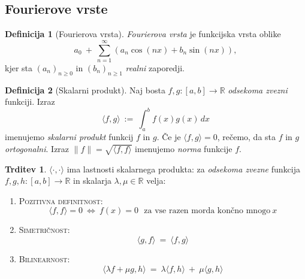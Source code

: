 \documentclass[11pt]{article}
\newcommand{\R}{\mathbb{R}}
\theoremstyle{definition}
\newtheorem{definicija}{Definicija}[section]
\theoremstyle{definition}
\newtheorem{trditev}{Trditev}[section]
\theoremstyle{definition}
\theoremstyle{theorem}
\begin{document}

\subsection{Fourierove vrste}
\vspace{0.5cm}

\begin{definicija}[Fourierova vrsta]

\textit{Fourierova vrsta} je funkcijska vrsta oblike
$$a_0 ~+~ \sum_{n=1}^{\infty} (a_n \cos(nx) + b_n \sin(nx)),$$
kjer sta $(a_n)_{n \geq 0}$ in $(b_n)_{n \geq 1}$ \textit{realni} zaporedji.

\end{definicija}
\vspace{0.5cm}

\begin{definicija}[Skalarni produkt]

Naj bosta $f, g: [a, b] \rightarrow \mathbb{R}$ \textit{odsekoma zvezni} funkciji. Izraz
$$\langle f, g \rangle ~:=~ \int_{a}^{b} f(x) g(x)\,dx$$
imenujemo \textit{skalarni produkt} funkcij $f$ in $g$. Če je $\langle f, g \rangle = 0$, rečemo, da sta $f$ in $g$ \textit{ortogonalni}. Izraz $\| f \| = \sqrt{\langle f, f \rangle}$ imenujemo \textit{norma} funkcije $f$.

\end{definicija}
\vspace{0.5cm}

\begin{trditev}

$\langle \cdot, \cdot \rangle$ ima lastnosti skalarnega produkta: za \textit{odsekoma zvezne} funkcija $f, g, h: [a, b] \rightarrow \R$ in skalarja $\lambda, \mu \in \R$ velja:
\begin{enumerate}
	
	\item[(1)] \textsc{Pozitivna definitnost}:	
	$$\langle f, f \rangle = 0 ~\iff~ f(x) = 0 ~~~\text{za vse razen morda končno mnogo}~ x$$
	
	\item[(2)] \textsc{Simetričnost}:
	$$\langle g, f \rangle ~=~ \langle f, g \rangle$$
	
	\item[(3)] \textsc{Bilinearnost}:
	$$\langle \lambda f + \mu g, h \rangle ~=~ \lambda \langle f, h \rangle ~+~ \mu \langle g, h \rangle$$	
	
\end{enumerate}

\end{trditev}
\vspace{0.5cm}
\end{document}
